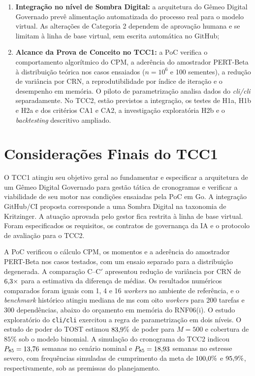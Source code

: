 \documentclass[12pt,openany,oneside,a4paper,english,brazilian,sumario=tradicional]{abntex2}
\begin{document}
\begin{enumerate}
  \item \textbf{Integração no nível de Sombra Digital:} a arquitetura do Gêmeo Digital Governado prevê alimentação automatizada do processo real para o modelo virtual. As alterações de Categoria 2 dependem de aprovação humana e se limitam à linha de base virtual, sem escrita automática no GitHub;
  \item \textbf{Alcance da Prova de Conceito no TCC1:} a PoC verifica o comportamento algorítmico do CPM, a aderência do amostrador PERT-Beta à distribuição teórica nos casos ensaiados ($n=10^6$ e 100 sementes), a redução de variância por CRN, a reprodutibilidade por índice de iteração e o desempenho em memória. O piloto de parametrização analisa dados do \textit{cli/cli} separadamente. No TCC2, estão previstos a integração, os testes de H1a, H1b e H2a e dos critérios CA1 e CA2, a investigação exploratória H2b e o \textit{backtesting} descritivo ampliado.
\end{enumerate}

\section{Considerações Finais do TCC1}

O TCC1 atingiu seu objetivo geral ao fundamentar e especificar a arquitetura de um Gêmeo Digital Governado para gestão tática de cronogramas e verificar a viabilidade de seu motor nas condições ensaiadas pela PoC em Go. A integração GitHub/CI proposta corresponde a uma Sombra Digital na taxonomia de Kritzinger. A atuação aprovada pelo gestor fica restrita à linha de base virtual. Foram especificados os requisitos, os contratos de governança da IA e o protocolo de avaliação para o TCC2.

A PoC verificou o cálculo CPM, os momentos e a aderência do amostrador PERT-Beta nos casos testados, com um ensaio separado para a distribuição degenerada. A comparação C--C$'$ apresentou redução de variância por CRN de $6{,}3{}\times$ para a estimativa da diferença de médias. Os resultados numéricos comparados foram iguais com 1, 4 e 16 \textit{workers} no ambiente de referência, e o \textit{benchmark} histórico atingiu mediana de \benchSynthWEightMedMs{} ms com oito \textit{workers} para 200 tarefas e 300 dependências, abaixo do orçamento em memória do RNF06(i). O estudo exploratório do \texttt{cli/\allowbreak cli} exercitou a regra de parametrização em dois níveis. O estudo de poder do TOST estimou $83{,}9{}\%$ de poder para $M=500$ e cobertura de $85\%$ sob o modelo binomial. A simulação do cronograma do TCC2 indicou $P_{85}=13{,}76{}$ semanas no cenário nominal e $P_{85}=18{,}93{}$ semanas no estresse severo, com frequências simuladas de cumprimento da meta de $100{,}0{}\%$ e $95{,}9{}\%$, respectivamente, sob as premissas do planejamento.
\end{document}
